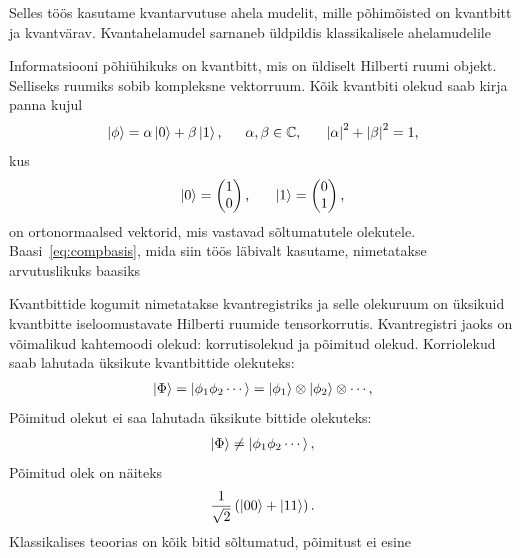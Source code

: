 \documentclass[12pt]{report}
\def\paren#1{\left(#1\right)}
\def\abs#1{\left|#1\right|}
\def\ket#1{\mathinner{|#1\rangle}}
\begin{document}
Selles töös kasutame kvantarvutuse ahela mudelit, mille põhimõisted on kvantbitt ja kvantvärav.
Kvantahelamudel sarnaneb üldpildis klassikalisele ahelamudelile~\cite{nielsen+chuang, kaye+laflamme+mosca}

Informatsiooni põhiühikuks on kvantbitt, mis on üldiselt Hilberti ruumi objekt.
Selliseks ruumiks sobib kompleksne vektorruum.
Kõik kvantbiti olekud saab kirja panna kujul
\begin{align}
    \ket{\phi} = \alpha \ket{0} + \beta \ket{1} \rlap{,}
    \qquad \alpha, \beta \in \mathbb{C} \rlap{,}
    \qquad \abs{\alpha}^2 + \abs{\beta}^2 = 1 \rlap{,}
\end{align}
kus
\begin{align}\label{eq:compbasis}
    \ket{0} = \begin{pmatrix}
        1 \\
        0 \\
    \end{pmatrix} \rlap{,}
    \qquad
    \ket{1} = \begin{pmatrix}
        0 \\
        1 \\
    \end{pmatrix} \rlap{,}
\end{align}
on ortonormaalsed vektorid, mis vastavad sõltumatutele olekutele.
Baasi~\eqref{eq:compbasis}, mida siin töös läbivalt kasutame, nimetatakse arvutuslikuks baasiks~\cite{mcardle+etal, nielsen+chuang, kaye+laflamme+mosca}

Kvantbittide kogumit nimetatakse kvantregistriks ja selle olekuruum on üksikuid kvantbitte iseloomustavate Hilberti ruumide tensorkorrutis. 
Kvantregistri jaoks on võimalikud kahtemoodi olekud: korrutisolekud ja põimitud olekud.
Korriolekud saab lahutada üksikute kvantbittide olekuteks:
\begin{align}
    \ket{\Phi}
    = \ket{\phi_1 \phi_2 \cdots}
    = \ket{\phi_1} \otimes \ket{\phi_2} \otimes \cdots \rlap{,}
\end{align}
Põimitud olekut ei saa lahutada üksikute bittide olekuteks:
\begin{align}
    \ket{\Phi}
    \ne \ket{\phi_1 \phi_2 \cdots} \rlap{,}
\end{align}
Põimitud olek on näiteks
\begin{align}
    \frac{1}{\sqrt{2}} \paren{\ket{00} + \ket{11}} \rlap{.}
\end{align}
Klassikalises teoorias on kõik bitid sõltumatud, põimitust ei esine~\cite{mcardle+etal, nielsen+chuang, kaye+laflamme+mosca}
\end{document}
